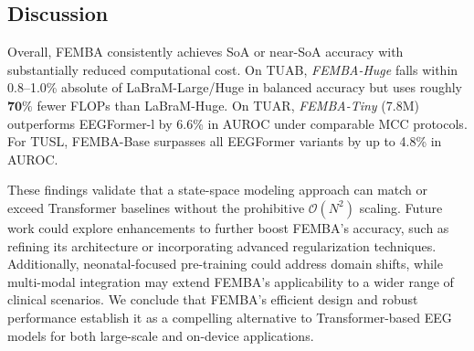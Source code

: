 \subsection{Discussion}
Overall, FEMBA consistently achieves SoA or near-SoA accuracy with substantially reduced computational cost. On TUAB, \emph{FEMBA-Huge} falls within 0.8--1.0\% absolute of LaBraM-Large/Huge in balanced accuracy but uses roughly \(\mathbf{70\%}\) fewer FLOPs than LaBraM-Huge. On TUAR, \emph{FEMBA-Tiny} (7.8M) outperforms EEGFormer-l by 6.6\% in AUROC under comparable MCC protocols. For TUSL, FEMBA-Base surpasses all EEGFormer variants by up to 4.8\% in AUROC.

These findings validate that a state-space modeling approach can match or exceed Transformer baselines without the prohibitive \(\mathcal{O}(N^2)\) scaling. Future work could explore enhancements to further boost FEMBA’s accuracy, such as refining its architecture or incorporating advanced regularization techniques. Additionally, neonatal-focused pre-training could address domain shifts, while multi-modal integration may extend FEMBA’s applicability to a wider range of clinical scenarios. We conclude that FEMBA’s efficient design and robust performance establish it as a compelling alternative to Transformer-based EEG models for both large-scale and on-device applications.

